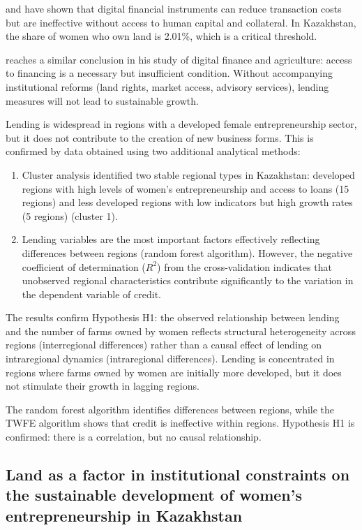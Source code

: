 ﻿\documentclass[pdflatex,sn-mathphys-ay]{sn-jnl}
\begin{document}
\citet{ref18} and \citet{ref56} have shown that digital
financial instruments can reduce transaction costs but are ineffective
without access to human capital and collateral. In Kazakhstan, the share
of women who own land is 2.01\%, which is a critical threshold.

\citet{ref43} reaches a similar conclusion in his study of
digital finance and agriculture: access to financing is a necessary but
insufficient condition. Without accompanying institutional reforms (land
rights, market access, advisory services), lending measures will not
lead to sustainable growth.

Lending is widespread in regions with a developed female
entrepreneurship sector, but it does not contribute to the creation of
new business forms. This is confirmed by data obtained using two
additional analytical methods:

\begin{enumerate}
\item Cluster analysis identified two stable regional types in
Kazakhstan: developed regions with high levels of women's
entrepreneurship and access to loans (15 regions) and less developed
regions with low indicators but high growth rates (5 regions)
(cluster 1).

\item Lending variables are the most important factors effectively
reflecting differences between regions (random forest algorithm).
However, the negative coefficient of determination ($R^2$) from the
cross-validation indicates that unobserved regional characteristics
contribute significantly to the variation in the dependent variable of
credit.
\end{enumerate}

The results confirm Hypothesis H1: the observed relationship between
lending and the number of farms owned by women reflects structural
heterogeneity across regions (interregional differences) rather than a
causal effect of lending on intraregional dynamics (intraregional
differences). Lending is concentrated in regions where farms owned by
women are initially more developed, but it does not stimulate their
growth in lagging regions.

The random forest algorithm identifies differences between regions,
while the TWFE algorithm shows that credit is ineffective within
regions. Hypothesis H1 is confirmed: there is a correlation, but no
causal relationship.

\subsection{Land as a factor in institutional constraints on the sustainable development of women's entrepreneurship in Kazakhstan}
\end{document}
